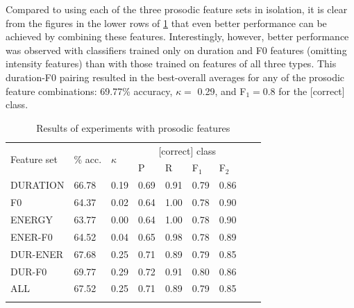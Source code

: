 		Compared to using each of the three prosodic feature sets in isolation, it is clear from the figures in the lower rows of \cref{tab:results:prosody} that even better performance can be achieved by combining these features. Interestingly, however, 
		better performance was observed with classifiers trained only on duration and F0 features (omitting intensity features) than with those trained on features of all three types.
		This duration-F0 pairing resulted in the best-overall averages for any of the prosodic feature combinations: 69.77\% accuracy, $\kappa = $ 0.29, and F$_1 = 0.8$ for the [correct] class.
		
		
		
		\begin{table}
			\centering
			\caption{Results of experiments with prosodic features }
			\begin{tabularx}{\textwidth}{lXXXXXXXX}			
			
			\toprule
			\multirow{2}{*}{Feature set} & \multirow{2}{*}{\% acc.} & \multirow{2}{*}{$\kappa$} & \multicolumn{4}{c}{[correct] class} \\
			 \cmidrule(lr){4-7}
			& & & P & R & F$_1$ & F$_2$ \\
			\midrule
		
DURATION	&	66.78	&	0.19	&	0.69	&	0.91	&	0.79	&	0.86	\\
F0	&	64.37	&	0.02	&	0.64	&	1.00	&	0.78	&	0.90	\\
ENERGY	&	63.77	&	0.00	&	0.64	&	1.00	&	0.78	&	0.90	\\
\addlinespace											
ENER-F0	&	64.52	&	0.04	&	0.65	&	0.98	&	0.78	&	0.89	\\
DUR-ENER	&	67.68	&	0.25	&	0.71	&	0.89	&	0.79	&	0.85	\\
DUR-F0	&	69.77	&	0.29	&	0.72	&	0.91	&	0.80	&	0.86	\\
\addlinespace											
ALL	&	67.52	&	0.25	&	0.71	&	0.89	&	0.79	&	0.85	\\		
			\bottomrule
			\label{tab:results:prosody}
			\end{tabularx}
		\end{table}
		
